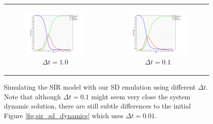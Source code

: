 \begin{figure}
\begin{center}
	\begin{tabular}{c c}
		\begin{subfigure}[b]{0.5\textwidth}
			\centering
			\includegraphics[width=.8\textwidth, angle=0]{./../shared/fig/frsd/SIR_SD_1000agents_150t_1dt.png}
			\caption{$\Delta t = 1.0$}
			\label{fig:sd_plot_10dt}
		\end{subfigure}
	
		& 
		
		\begin{subfigure}[b]{0.5\textwidth}
			\centering
			\includegraphics[width=.8\textwidth, angle=0]{./../shared/fig/frsd/SIR_SD_1000agents_150t_01dt.png}
			\caption{$\Delta t = 0.1$}
			\label{fig:sd_plot_0.1dt}
		\end{subfigure}
	\end{tabular}
	
	\caption{Simulating the SIR model with our SD emulation using different $\Delta t $. Note that although $\Delta t = 0.1$ might seem very close the system dynamic solution, there are still subtle differences to the initial Figure \ref{fig:sir_sd_dynamics} which uses $\Delta t = 0.01$.}
	\label{fig:sd_plots}
\end{center}
\end{figure}

